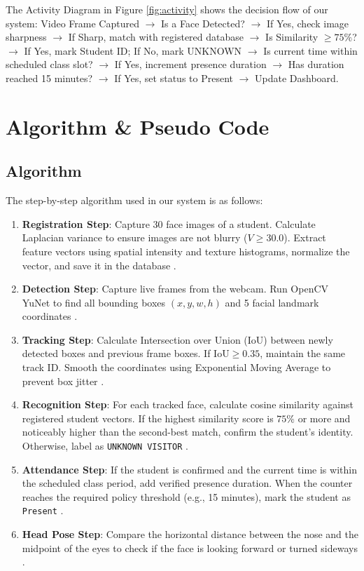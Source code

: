 \documentclass[10pt]{report}
\begin{document}
\hspace{0.5cm}The Activity Diagram in Figure \ref{fig:activity} shows the decision flow of our system:
Video Frame Captured $\rightarrow$ Is a Face Detected? $\rightarrow$ If Yes, check image sharpness $\rightarrow$ If Sharp, match with registered database $\rightarrow$ Is Similarity $\ge 75\%$? $\rightarrow$ If Yes, mark Student ID; If No, mark UNKNOWN $\rightarrow$ Is current time within scheduled class slot? $\rightarrow$ If Yes, increment presence duration $\rightarrow$ Has duration reached 15 minutes? $\rightarrow$ If Yes, set status to Present $\rightarrow$ Update Dashboard.

\section{Algorithm \& Pseudo Code}

\subsection{Algorithm}
\hspace{0.5cm}The step-by-step algorithm used in our system is as follows:
\begin{enumerate}
    \item \textbf{Registration Step}: Capture 30 face images of a student. Calculate Laplacian variance to ensure images are not blurry ($V \ge 30.0$). Extract feature vectors using spatial intensity and texture histograms, normalize the vector, and save it in the database \cite{george2024edgeface}.
    \item \textbf{Detection Step}: Capture live frames from the webcam. Run OpenCV YuNet to find all bounding boxes $(x, y, w, h)$ and 5 facial landmark coordinates \cite{zhang2023realtime}.
    \item \textbf{Tracking Step}: Calculate Intersection over Union (IoU) between newly detected boxes and previous frame boxes. If $\text{IoU} \ge 0.35$, maintain the same track ID. Smooth the coordinates using Exponential Moving Average to prevent box jitter \cite{zhu2023tracking}.
    \item \textbf{Recognition Step}: For each tracked face, calculate cosine similarity against registered student vectors. If the highest similarity score is $75\%$ or more and noticeably higher than the second-best match, confirm the student's identity. Otherwise, label as \texttt{UNKNOWN VISITOR} \cite{angulakshmi2024face}.
    \item \textbf{Attendance Step}: If the student is confirmed and the current time is within the scheduled class period, add verified presence duration. When the counter reaches the required policy threshold (e.g., 15 minutes), mark the student as \texttt{Present} \cite{rajesh2023smart}.
    \item \textbf{Head Pose Step}: Compare the horizontal distance between the nose and the midpoint of the eyes to check if the face is looking forward or turned sideways \cite{booth2023engagement, ghodekar2023activeness}.
\end{enumerate}
\end{document}
